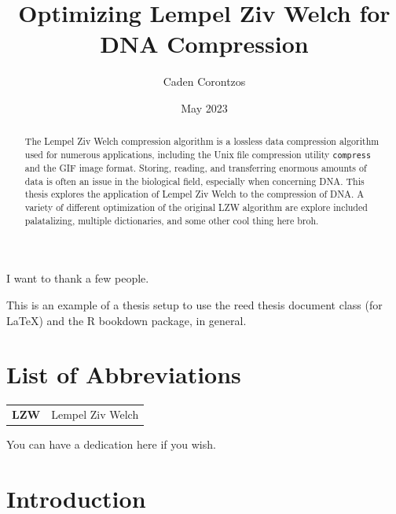 \documentclass[12pt,twoside]{reedthesis}
\title{Optimizing Lempel Ziv Welch for DNA Compression}
\author{Caden Corontzos}
\date{May 2023}
\begin{document}
  \maketitle

\frontmatter %
\pagestyle{empty} %
  \begin{acknowledgements}
    I want to thank a few people.
  \end{acknowledgements}
  \begin{preface}
    This is an example of a thesis setup to use the reed thesis document class
    (for LaTeX) and the R bookdown package, in general.
  \end{preface}
\chapter*{List of Abbreviations}
\begin{table}[h]
    \centering
    \begin{tabular}{ll}
                \textbf{LZW} & Lempel Ziv Welch \\
            \end{tabular}
\end{table}
  \hypersetup{linkcolor=black}
  \setcounter{secnumdepth}{2}
  \setcounter{tocdepth}{2}
  \tableofcontents

  \listoftables

  \listoffigures
  \begin{abstract}
    The Lempel Ziv Welch compression algorithm is a lossless data compression algorithm used for numerous applications, including the Unix file compression utility \texttt{compress} and the GIF image format. Storing, reading, and transferring enormous amounts of data is often an issue in the biological field, especially when concerning DNA. This thesis explores the application of Lempel Ziv Welch to the compression of DNA. A variety of different optimization of the original LZW algorithm are explore included palatalizing, multiple dictionaries, and some other cool thing here broh.
  \end{abstract}
  \begin{dedication}
    You can have a dedication here if you wish.
  \end{dedication}
\mainmatter %
\pagestyle{fancyplain} %

\hypertarget{introduction}{%
\chapter*{Introduction}\label{introduction}}
\end{document}
